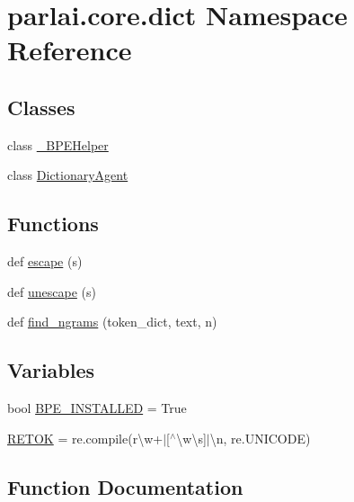 \hypertarget{namespaceparlai_1_1core_1_1dict}{}\section{parlai.\+core.\+dict Namespace Reference}
\label{namespaceparlai_1_1core_1_1dict}
\subsection*{Classes}
\begin{DoxyCompactItemize}
\item 
class \hyperlink{classparlai_1_1core_1_1dict_1_1__BPEHelper}{\+\_\+\+B\+P\+E\+Helper}
\item 
class \hyperlink{classparlai_1_1core_1_1dict_1_1DictionaryAgent}{Dictionary\+Agent}
\end{DoxyCompactItemize}
\subsection*{Functions}
\begin{DoxyCompactItemize}
\item 
def \hyperlink{namespaceparlai_1_1core_1_1dict_ae44fe4a2be005a4023a758a58f656495}{escape} (s)
\item 
def \hyperlink{namespaceparlai_1_1core_1_1dict_a4d8952ff127b540967c707a58e8ebb48}{unescape} (s)
\item 
def \hyperlink{namespaceparlai_1_1core_1_1dict_a5e9eb43b6c0dce0b3aab7f3ea3717de6}{find\+\_\+ngrams} (token\+\_\+dict, text, n)
\end{DoxyCompactItemize}
\subsection*{Variables}
\begin{DoxyCompactItemize}
\item 
bool \hyperlink{namespaceparlai_1_1core_1_1dict_a9adf6ecd08289a0b0faa90fd2a507e91}{B\+P\+E\+\_\+\+I\+N\+S\+T\+A\+L\+L\+ED} = True
\item 
\hyperlink{namespaceparlai_1_1core_1_1dict_acc80030514561837c1010293fd1010f4}{R\+E\+T\+OK} = re.\+compile(r\textquotesingle{}\textbackslash{}w+$\vert$\mbox{[}$^\wedge$\textbackslash{}w\textbackslash{}s\mbox{]}$\vert$\textbackslash{}n\textquotesingle{}, re.\+U\+N\+I\+C\+O\+DE)
\end{DoxyCompactItemize}


\subsection{Function Documentation}
\mbox{\label{namespaceparlai_1_1core_1_1dict_ae44fe4a2be005a4023a758a58f656495}} 
